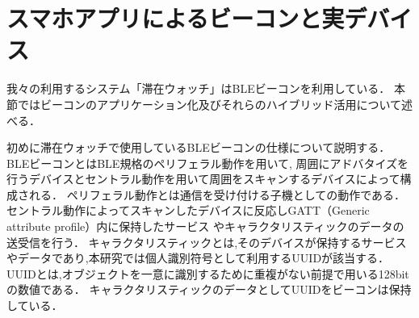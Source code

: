 \section{スマホアプリによるビーコンと実デバイス}\label{4.3}
我々の利用するシステム「滞在ウォッチ」はBLEビーコンを利用している．
本節ではビーコンのアプリケーション化及びそれらのハイブリッド活用について述べる．

初めに滞在ウォッチで使用しているBLEビーコンの仕様について説明する．
BLEビーコンとはBLE規格のペリフェラル動作を用いて,
周囲にアドバタイズを行うデバイスとセントラル動作を用いて周囲をスキャンするデバイスによって構成される．
ペリフェラル動作とは通信を受け付ける子機としての動作である．
セントラル動作によってスキャンしたデバイスに反応しGATT（Generic attribute profile）内に保持したサービス
やキャラクタリスティックのデータの送受信を行う．
キャラクタリスティックとは,そのデバイスが保持するサービスやデータであり,本研究では個人識別符号として利用するUUIDが該当する．
UUIDとは,オブジェクトを一意に識別するために重複がない前提で用いる128bitの数値である．
キャラクタリスティックのデータとしてUUIDをビーコンは保持している．









